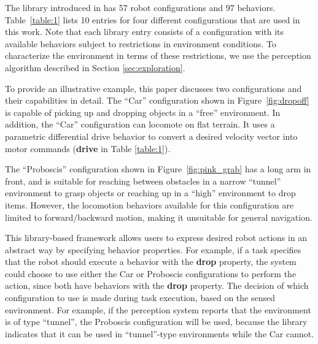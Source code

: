 \documentclass[journal]{IEEEtran}
\begin{document}
The library introduced in \cite{Jing2016} has 57 robot configurations and 97 behaviors.
Table~\ref{table:1} lists 10 entries for four different configurations that are used in this work.
Note that each library entry consists of a configuration with its available behaviors subject to restrictions in environment conditions. To characterize the environment in terms of these restrictions, we use the perception algorithm described in Section \ref{sec:exploration}.

To provide an illustrative example, this paper discusses two configurations and their capabilities in detail.
The ``Car'' configuration shown in Figure~\ref{fig:dropoff} is capable of picking
up and dropping objects in a ``free'' environment. In addition, the ``Car'' configuration can locomote on flat terrain. It uses a parametric differential drive behavior to convert a desired velocity vector into motor commands (\textbf{drive} in Table \ref{table:1}).

The ``Proboscis'' configuration shown in Figure~\ref{fig:pink_grab} has
a long arm in front, and is suitable for reaching between obstacles in a narrow ``tunnel'' environment to grasp objects or reaching up in a ``high'' environment to drop items.
However, the locomotion behaviors available for this configuration are limited to forward/backward
motion, making it unsuitable for general navigation.

This library-based framework allows users to express desired robot actions in an abstract way by specifying behavior properties. For example, if a task specifies that the robot should execute a behavior with the \textbf{drop} property, the system could choose to use either the Car or Proboscis configurations to perform the action, since both have behaviors with the \textbf{drop} property.
The decision of which configuration to use is made during task execution, based on the sensed environment.
For example, if the perception system reports that the environment is of type ``tunnel'', the Proboscis configuration will be used, because the library indicates that it can be used in ``tunnel''-type environments while the Car cannot.
\end{document}

